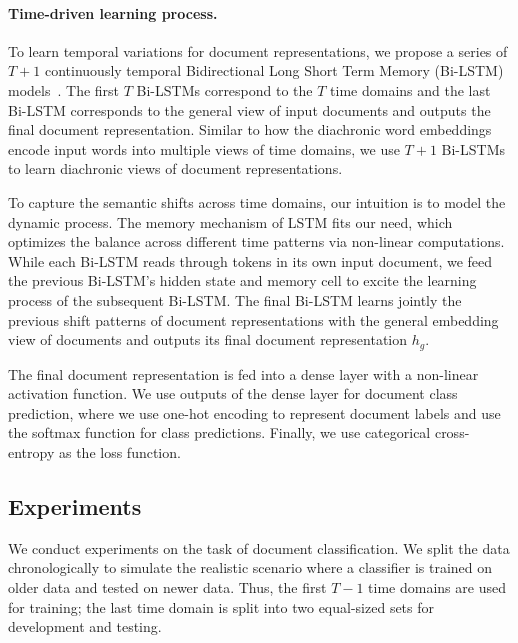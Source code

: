 \paragraph{Time-driven learning process.}
To learn temporal variations for document representations, we propose a series of $T+1$ continuously temporal Bidirectional Long Short Term Memory (Bi-LSTM) models~\cite{hochreiter1997long}. The first $T$ Bi-LSTMs correspond to the $T$ time domains and the last Bi-LSTM corresponds to the general view of input documents and outputs the final document representation. Similar to how the diachronic word embeddings encode input words into multiple views of time domains, we use $T+1$ Bi-LSTMs to learn diachronic views of document representations. 

To capture the semantic shifts across time domains, our intuition is to model the dynamic process. The memory mechanism of LSTM fits our need, which optimizes the balance across different time patterns via non-linear computations. While each Bi-LSTM reads through tokens in its own input document, we feed the previous Bi-LSTM's hidden state and memory cell to excite the learning process of the subsequent Bi-LSTM. The final Bi-LSTM learns jointly the previous shift patterns of document representations with the general embedding view of documents and outputs its final document representation $h_g$. 

The final document representation is fed into a dense layer with a non-linear activation function. We use outputs of the dense layer for document class prediction,
where we use one-hot encoding to represent document labels and use the softmax function for class predictions. Finally, we use categorical cross-entropy as the loss function.



\subsection{Experiments}
\label{chap3:sec:dweExp}

We conduct experiments on the task of document classification.
We split the data chronologically to simulate the realistic scenario where a classifier is trained on older data and tested on newer data. 
Thus, the first $T-1$ time domains are used for training;
the last time domain is split into two equal-sized sets for development and testing.

